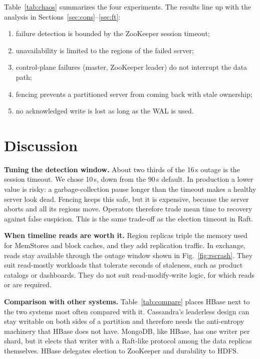 Table~\ref{tab:chaos} summarizes the four experiments. The results line up with the analysis in Sections~\ref{sec:cons}--\ref{sec:ft}:
\begin{enumerate}
\item failure detection is bounded by the ZooKeeper session timeout;
\item unavailability is limited to the regions of the failed server;
\item control-plane failures (master, ZooKeeper leader) do not interrupt the data path;
\item fencing prevents a partitioned server from coming back with stale ownership;
\item no acknowledged write is lost as long as the WAL is used.
\end{enumerate}

\section{Discussion}
\textbf{Tuning the detection window.} About two thirds of the 16\,s outage is the session timeout. We chose 10\,s, down from the 90\,s default. In production a lower value is risky: a garbage-collection pause longer than the timeout makes a healthy server look dead. Fencing keeps this safe, but it is expensive, because the server aborts and all its regions move. Operators therefore trade mean time to recovery against false suspicion. This is the same trade-off as the election timeout in Raft.

\textbf{When timeline reads are worth it.} Region replicas triple the memory used for MemStores and block caches, and they add replication traffic. In exchange, reads stay available through the outage window shown in Fig.~\ref{fig:rscrash}. They suit read-mostly workloads that tolerate seconds of staleness, such as product catalogs or dashboards. They do not suit read-modify-write logic, for which  reads or  are required.

\textbf{Comparison with other systems.} Table~\ref{tab:compare} places HBase next to the two systems most often compared with it. Cassandra's leaderless design can stay writable on both sides of a partition and therefore needs the anti-entropy machinery that HBase does not have. MongoDB, like HBase, has one writer per shard, but it elects that writer with a Raft-like protocol among the data replicas themselves. HBase delegates election to ZooKeeper and durability to HDFS.



